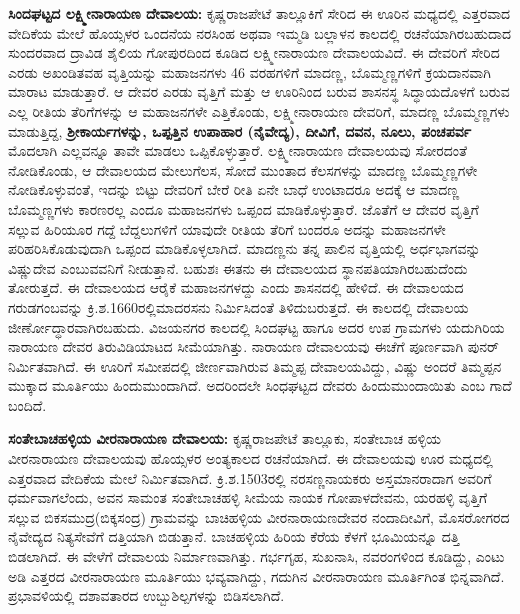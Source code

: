 \textbf{ಸಿಂದಘಟ್ಟದ ಲಕ್ಷ್ಮೀನಾರಾಯಣ ದೇವಾಲಯ:} ಕೃಷ್ಣರಾಜಪೇಟೆ ತಾಲ್ಲೂಕಿಗೆ ಸೇರಿದ ಈ ಊರಿನ ಮಧ್ಯದಲ್ಲಿ ಎತ್ತರವಾದ ವೇದಿಕೆಯ ಮೇಲೆ ಹೊಯ್ಸಳರ ಒಂದನೆಯ ನರಸಿಂಹ ಅಥವಾ ಇಮ್ಮಡಿ ಬಲ್ಲಾಳನ ಕಾಲದಲ್ಲಿ ರಚನೆಯಾಗಿರ\-ಬಹುದಾದ ಸುಂದರವಾದ ದ್ರಾವಿಡ ಶೈಲಿಯ ಗೋಪುರದಿಂದ ಕೂಡಿದ ಲಕ್ಷ್ಮೀನಾರಾಯಣ ದೇವಾಲಯವಿದೆ. ಈ ದೇವರಿಗೆ ಸೇರಿದ ಎರಡು ಅಖಂಡಿತವಹ ವೃತ್ತಿಯನ್ನು ಮಹಾಜನಗಳು 46 ವರಹಗಳಿಗೆ ಮಾದಣ್ಣ, ಬೊಮ್ಮಣ್ಣಗಳಿಗೆ ಕ್ರಯದಾನವಾಗಿ ಮಾರಾಟ ಮಾಡುತ್ತಾರೆ. ಆ ದೇವರ ಎರಡು ವೃತ್ತಿಗೆ ಮತ್ತು ಆ ಊರಿನಿಂದ ಬರುವ ಶಾಸನಸ್ಥ ಸಿದ್ಧಾಯದೊಳಗೆ ಬರುವ ಎಲ್ಲ ರೀತಿಯ ತೆರಿಗೆಗಳನ್ನು ಆ ಮಹಾಜನಗಳೇ ಎತ್ತಿಕೊಂಡು, ಲಕ್ಷ್ಮೀನಾರಾಯಣ ದೇವರಿಗೆ, ಮಾದಣ್ಣ ಬೊಮ್ಮಣ್ಣಗಳು ಮಾಡುತ್ತಿದ್ದ, \textbf{ಶ‍್ರೀಕಾರ್ಯಗಳನ್ನು, ಒಪ್ಪತ್ತಿನ ಉಪಾಹಾರ (ನೈವೇದ್ಯ), ದೀವಿಗೆ, ದವನ, ನೂಲು, ಪಂಚಪರ್ವ }ಮೊದಲಾಗಿ ಎಲ್ಲವನ್ನೂ ತಾವೇ ಮಾಡಲು ಒಪ್ಪಿಕೊಳ್ಳುತ್ತಾರೆ. ಲಕ್ಷ್ಮೀನಾರಾಯಣ ದೇವಾಲಯವು ಸೋರದಂತೆ ನೋಡಿಕೊಂಡು, ಆ ದೇವಾಲಯದ ಮೇಲುಗೆಲಸ, ಸೋದೆ ಮುಂತಾದ ಕೆಲಸಗಳನ್ನು ಮಾದಣ್ಣ ಬೊಮ್ಮಣ್ಣಗಳೇ ನೋಡಿಕೊಳ್ಳುವಂತೆ, ಇದನ್ನು ಬಿಟ್ಟು ದೇವರಿಗೆ ಬೇರೆ ರೀತಿ ಏನೇ ಬಾಧೆ ಉಂಟಾದರೂ ಅದಕ್ಕೆ ಆ ಮಾದಣ್ಣ ಬೊಮ್ಮಣ್ಣಗಳು ಕಾರಣರಲ್ಲ ಎಂದೂ ಮಹಾಜನಗಳು ಒಪ್ಪಂದ ಮಾಡಿಕೊಳ್ಳುತ್ತಾರೆ. ಜೊತೆಗೆ ಆ ದೇವರ ವೃತ್ತಿಗೆ ಸಲ್ಲುವ ಹಿರಿಯೂರ ಗದ್ದೆ ಬೆದ್ದಲುಗಳಿಗೆ ಯಾವುದೇ ರೀತಿಯ ತೆರಿಗೆ ಬಂದರೂ ಅದನ್ನು ಮಹಾಜನಗಳೇ ಪರಿಹರಿಸಿಕೊಡುವುದಾಗಿ ಒಪ್ಪಂದ ಮಾಡಿಕೊಳ್ಳಲಾಗಿದೆ. ಮಾದಣ್ಣನು ತನ್ನ ಪಾಲಿನ ವೃತ್ತಿಯಲ್ಲಿ ಅರ್ಧಭಾಗವನ್ನು ವಿಷ್ಣುದೇವ ಎಂಬುವವನಿಗೆ ನೀಡುತ್ತಾನೆ. ಬಹುಶಃ ಈತನು ಈ ದೇವಾಲಯದ ಸ್ಥಾನಪತಿಯಾಗಿರಬಹುದೆಂದು ತೋರುತ್ತದೆ. ಈ ದೇವಾಲಯದ ಆರೈಕೆ ಮಹಾಜನಗಳದ್ದು ಎಂದು ಶಾಸನದಲ್ಲಿ ಹೇಳಿದೆ. ಈ ದೇವಾಲಯದ ಗರುಡಗಂಬವನ್ನು ಕ್ರಿ.ಶ.1660ರಲ್ಲಿಮಾದರಸನು ನಿರ್ಮಿಸಿದಂತೆ ತಿಳಿದುಬರುತ್ತದೆ. ಈ ಕಾಲದಲ್ಲಿ ದೇವಾಲಯ ಜೀರ್ಣೋದ್ಧಾರವಾಗಿರಬಹುದು. ವಿಜಯನಗರ ಕಾಲದಲ್ಲಿ ಸಿಂದಘಟ್ಟ ಹಾಗೂ ಅದರ ಉಪ ಗ್ರಾಮಗಳು ಯದುಗಿರಿಯ ನಾರಾಯಣ ದೇವರ ತಿರುವಿಡಿಯಾಟದ ಸೀಮೆಯಾಗಿತ್ತು. ನಾರಾಯಣ ದೇವಾಲಯವು ಈಚೆಗೆ ಪೂರ್ಣವಾಗಿ ಪುನರ್​ನಿರ್ಮಿತವಾಗಿದೆ. ಈ ಊರಿಗೆ ಸಮೀಪದಲ್ಲಿ ಜೀರ್ಣವಾಗಿರುವ ತಿಮ್ಮಪ್ಪ ದೇವಾಲಯವಿದ್ದು, ವಿಷ್ಣು ಅಂದರೆ ತಿಮ್ಮಪ್ಪನ ಮುಕ್ಕಾದ ಮೂರ್ತಿಯು ಹಿಂದುಮುಂದಾಗಿದೆ. ಅದರಿಂದಲೇ ಸಿಂಧಘಟ್ಟದ ದೇವರು ಹಿಂದುಮುಂದಾಯಿತು ಎಂಬ ಗಾದೆ ಬಂದಿದೆ.

\textbf{ಸಂತೇಬಾಚಹಳ್ಳಿಯ ವೀರನಾರಾಯಣ ದೇವಾಲಯ:} ಕೃಷ್ಣರಾಜಪೇಟೆ ತಾಲ್ಲೂಕು, ಸಂತೇಬಾಚ ಹಳ್ಳಿಯ ವೀರ\-ನಾರಾಯಣ ದೇವಾಲಯವು ಹೊಯ್ಸಳರ ಅಂತ್ಯಕಾಲದ ರಚನೆಯಾಗಿದೆ. ಈ ದೇವಾಲಯವು ಊರ ಮಧ್ಯದಲ್ಲಿ ಎತ್ತರವಾದ ವೇದಿಕೆಯ ಮೇಲೆ ನಿರ್ಮಿತವಾಗಿದೆ. ಕ್ರಿ.ಶ.1503ರಲ್ಲಿ ನರಸಣ್ಣನಾಯಕರು ಅಸ್ತಮಾನರಾದಾಗ ಅವರಿಗೆ ಧರ್ಮವಾಗಲೆಂದು, ಅವನ ಸಾಮಂತ ಸಂತೇಬಾಚಹಳ್ಳಿ ಸೀಮೆಯ ನಾಯಕ ಗೋಪಾಳದೇವನು, ಯರಹಳ್ಳಿ ವೃತ್ತಿಗೆ ಸಲ್ಲುವ ಬಿಕಸಮುದ್ರ(ಬಿಕ್ಕಸಂದ್ರ) ಗ್ರಾಮವನ್ನು ಬಾಚಿಹಳ್ಳಿಯ ವೀರನಾರಾಯಣದೇವರ ನಂದಾದೀವಿಗೆ, ಮೊಸರೋಗರದ ನೈವೇದ್ಯದ ನಿತ್ಯಸೇವೆಗೆ ದತ್ತಿಯಾಗಿ ಬಿಡುತ್ತಾನೆ. ಬಾಚಹಳ್ಳಿಯ ಹಿರಿಯ ಕೆರೆಯ ಕೆಳಗೆ ಭೂಮಿಯನ್ನೂ ದತ್ತಿ ಬಿಡಲಾಗಿದೆ. ಈ ವೇಳೆಗೆ ದೇವಾಲಯ ನಿರ್ಮಾಣವಾಗಿತ್ತು. ಗರ್ಭಗೃಹ, ಸುಖನಾಸಿ, ನವರಂಗಳಿಂದ ಕೂಡಿದ್ದು, ಎಂಟು ಅಡಿ ಎತ್ತರದ ವೀರನಾರಾಯಣ ಮೂರ್ತಿಯು ಭವ್ಯವಾಗಿದ್ದು, ಗದುಗಿನ ವೀರನಾರಾಯಣ ಮೂರ್ತಿಗಿಂತ ಭಿನ್ನವಾಗಿದೆ. ಪ್ರಭಾವಳಿಯಲ್ಲಿ ದಶಾವತಾರದ ಉಬ್ಬುಶಿಲ್ಪಗಳನ್ನು ಬಿಡಿಸಲಾಗಿದೆ.

